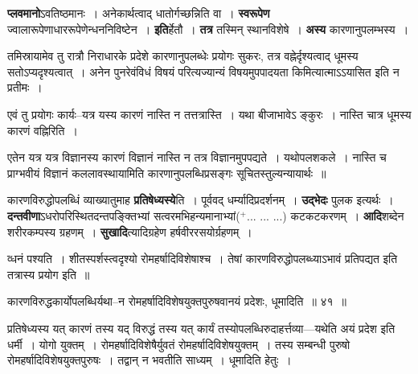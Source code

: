 \documentclass[article,12pt,a4paper]{memoir}
\newcommand{\add}[1]{($^{+}$#1)}
\begin{document}
	  \pstart \textbf{प्लवमानो}ऽवतिष्ठमानः । अनेकार्थत्वाद् धातोर्गच्छन्निति वा । \textbf{स्वरूपेण} ज्वालारूपेणाधाररूपेणेन्धननिविष्टेन । \textbf{इति}र्हेतौ । \textbf{तत्र} तस्मिन् स्थानविशेषे । \textbf{अस्य} कारणानुपलम्भस्य ।
	\pend
      

	  \pstart तमिस्रायामेव तु रात्रौ निराधारके प्रदेशे कारणानुपलब्धेः प्रयोगः सुकरः, तत्र वह्नेर्दृश्यत्वाद् धूमस्य सतोऽप्यदृश्यत्वात् । अनेन पुनरेवंविधं विषयं परित्यज्यान्यं विषयमुपपादयता किमित्यात्माऽऽयासित इति न प्रतीमः ।
	\pend
      

	  \pstart एवं तु प्रयोगः कार्यः--यत्र यस्य कारणं नास्ति न तत्तत्रास्ति । यथा बीजाभावेऽ ङ्कुरः । नास्ति चात्र धूमस्य कारणं वह्निरिति ।
	\pend
      

	  \pstart एतेन यत्र यत्र विज्ञानस्य कारणं विज्ञानं नास्ति न तत्र विज्ञानमुपपद्यते । यथोपलशकले । नास्ति च प्राग्भवीयं विज्ञानं कललावस्थायामिति कारणानुपलब्धिप्रसङ्गः सूचितस्तुल्यन्यायार्थः ॥
	\pend
      

	  \pstart कारणविरुद्धोपलब्धिं व्याख्यातुमाह \textbf{प्रतिषेध्यस्ये}ति । पूर्ववद् धर्म्यादिप्रदर्शनम् । \textbf{उद्भेदः} पुलक इत्यर्थः । \textbf{दन्तवीणा}ऽधरोपरिस्थितदन्तपङ्क्तिभ्यां सत्वरमभिहन्यमानाभ्यां\add{... ... ...} कटकटकरणम् । \textbf{आदि}शब्देन शरीरकम्पस्य ग्रहणम् । \textbf{सुखादि}त्यादिग्रहेण हर्षवीररसयोर्ग्रहणम् ।
	\pend
	  \bigskip
	  \begingroup
	

	  \pstart व्धनं पश्यति । शीतस्पर्शस्त्वदृश्यो रोमहर्षादिविशेषाश्च । तेषां कारणविरुद्धोपलब्ध्याऽभावं प्रतिपद्यत इति तत्रास्य प्रयोग इति ॥
	\pend
        
	  \bigskip
	  \begingroup
	

	  \pstart कारणविरुद्धकार्योपलब्धिर्यथा--न रोमहर्षादिविशेषयुक्तपुरुषवानयं प्रदेशः, धूमादिति ॥ ४१ ॥
	\pend
      
	  \endgroup
	 

	  \pstart प्रतिषेध्यस्य यत् कारणं तस्य यद् विरुद्धं तस्य यत् कार्यं तस्योपलब्धिरुदाहर्त्तव्या—यथेति अयं प्रदेश इति धर्मी । योगो युक्तम् । रोमहर्षादिविशेषैर्युवतं रोमहर्षादिविशेषयुक्तम् । तस्य सम्बन्धी पुरुषो रोमहर्षादिविशेषयुक्तपुरुषः । तद्वान् न भवतीति साध्यम् । धूमादिति हेतुः ।
	\pend
      
\end{document}
